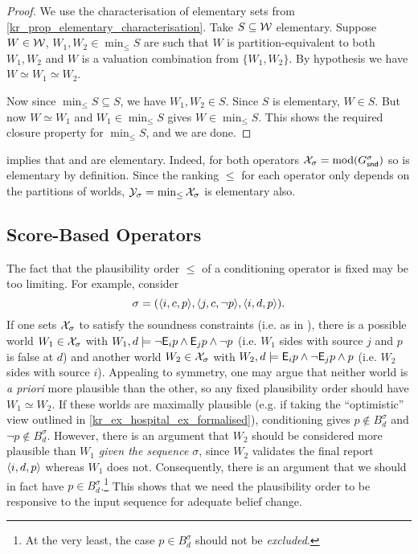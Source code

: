 \begin{proof}
    We use the characterisation of elementary sets from
    \cref{kr_prop_elementary_characterisation}. Take $S \subseteq \mathcal{W}$ elementary.
    Suppose $W \in \mathcal{W}$, $W_1, W_2 \in \min_{\le}{S}$ are such that $W$ is
    partition-equivalent to both $W_1, W_2$ and $W$ is a valuation combination
    from $\{W_1, W_2\}$. By hypothesis we have $W \simeq W_1 \simeq W_2$.

    Now since $\min_{\le}{S} \subseteq S$, we have $W_1, W_2 \in S$. Since $S$
    is elementary, $W \in S$. But now $W \simeq W_1$ and $W_1 \in
    \min_{\le}{S}$ gives $W \in \min_{\le}{S}$. This shows the required closure
    property for $\min_{\le}{S}$, and we are done.
\end{proof}

 implies that
\varbasedcond{} and \partbasedcond{} are elementary. Indeed, for both operators
$\mathcal{X}_\sigma = \operatorname{mod}(G^\sigma_{\mathsf{snd}})$ so is elementary by definition. Since the
ranking $\le$ for each operator only depends on the partitions of worlds,
$\mathcal{Y}_\sigma =
\min_{\le}{\mathcal{X}_\sigma}$ is elementary also.

\subsection{Score-Based Operators}
\label{kr_sec_score_based}

The fact that the plausibility order $\le$ of a conditioning operator is fixed
may be too limiting. For example, consider
\[
    \sigma
    =
    (\langle {i, c, p} \rangle,
    \langle {j, c, \neg p} \rangle,
    \langle {i, d, p} \rangle).
\]
%
If one sets $\mathcal{X}_\sigma$ to satisfy the soundness constraints (i.e. as in
\weakop{}), there is a possible
world $W_1 \in \mathcal{X}_\sigma$ with $W_1, d \models \neg \mathsf{E}_i{p} \land \mathsf{E}_j{p} \land
\neg p$ (i.e. $W_1$ sides with source $j$ and $p$ is false at $d$) and another
world $W_2 \in \mathcal{X}_\sigma$ with $W_2, d \models \mathsf{E}_i{p} \land \neg \mathsf{E}_j{p} \land
p$ (i.e. $W_2$ sides with source $i$). Appealing to symmetry, one may argue
that neither world is \emph{a priori} more plausible than the other, so any
fixed plausibility order should have $W_1 \simeq W_2$. If these worlds
are maximally plausible (e.g. if taking the ``optimistic'' view outlined in
\cref{kr_ex_hospital_ex_formalised}), conditioning gives $p \notin B^\sigma_d$ and
$\neg p \notin B^\sigma_d$.
%
However, there is an argument that $W_2$ should be considered more plausible
than $W_1$ \emph{given the sequence $\sigma$}, since $W_2$ validates the final
report $\langle {i, d, p} \rangle$ whereas $W_1$ does not. Consequently, there is an
argument that we should in fact have $p \in B^\sigma_d$.\footnote{At the very
least, the case $p \in B^\sigma_d$ should not be \emph{excluded}.} This shows
that we need the plausibility order to be responsive to the input sequence for
adequate belief change.\footnotemark{}

